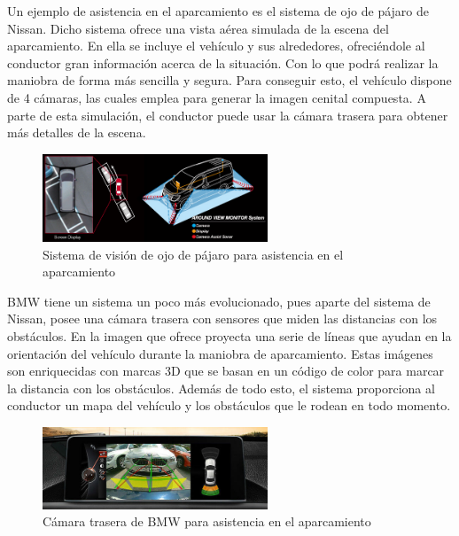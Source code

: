 Un ejemplo de asistencia en el aparcamiento es el sistema de ojo de pájaro de Nissan. Dicho sistema ofrece una vista aérea simulada de la escena del aparcamiento. En ella se incluye el vehículo y sus alrededores, ofreciéndole al conductor gran información acerca de la situación. Con lo que podrá realizar la maniobra de forma más sencilla y segura. Para conseguir esto, el vehículo dispone de 4 cámaras, las cuales emplea para generar la imagen cenital compuesta. A parte de esta simulación, el conductor puede usar la cámara trasera para obtener más detalles de la escena.

\begin{figure}[H]
  \begin{center}
    \includegraphics[width=0.6\textwidth]{figures/Introduccion/nissan.jpg}
		\caption{Sistema de visión de ojo de pájaro para asistencia en el aparcamiento}
		\label{fig.nissan}
		\end{center}
\end{figure}

BMW tiene un sistema un poco más evolucionado, pues  aparte del sistema de Nissan, posee una cámara trasera con sensores que miden las distancias con los obstáculos. En la imagen que ofrece proyecta una serie de líneas que ayudan en la orientación del vehículo durante la maniobra de aparcamiento. Estas imágenes son enriquecidas con marcas 3D que se basan en un código de color para marcar la distancia con los obstáculos. Además de todo esto, el sistema proporciona al conductor un mapa del vehículo y los obstáculos que le rodean en todo momento.

\begin{figure}[H]
  \begin{center}
    \includegraphics[width=0.6\textwidth]{figures/Introduccion/bmw.jpg}
		\caption{ Cámara trasera de BMW para asistencia en el aparcamiento}
		\label{fig.bmw}
		\end{center}
\end{figure}

